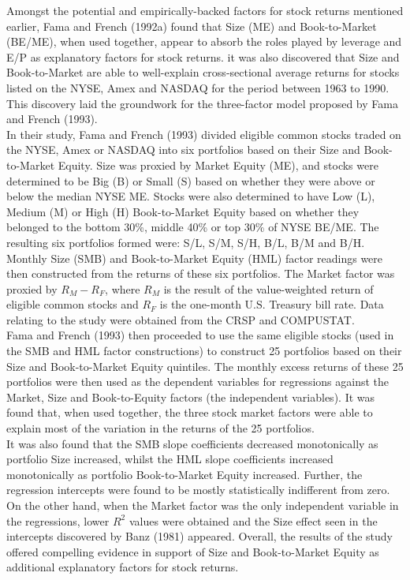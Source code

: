 \documentclass[12pt]{article}
\begin{document}
	\noindent Amongst the potential and empirically-backed factors for stock returns mentioned earlier, Fama and French (1992a) found that Size (ME) and Book-to-Market (BE/ME), when used together, appear to absorb the roles played by leverage and E/P as explanatory factors for stock returns. it was also discovered that Size and Book-to-Market are able to well-explain cross-sectional average returns for stocks listed on the NYSE, Amex and NASDAQ for the period between 1963 to 1990. This discovery laid the groundwork for the three-factor model proposed by Fama and French (1993).\\
	
	\noindent In their study, Fama and French (1993) divided eligible common stocks traded on the NYSE, Amex or NASDAQ into six portfolios based on their Size and Book-to-Market Equity. Size was proxied by Market Equity (ME), and stocks were determined to be Big (B) or Small (S) based on whether they were above or below the median NYSE ME. Stocks were also determined to have Low (L), Medium (M) or High (H) Book-to-Market Equity based on whether they belonged to the bottom 30\%, middle 40\% or top 30\% of NYSE BE/ME. The resulting six portfolios formed were: S/L, S/M, S/H, B/L, B/M and B/H. Monthly Size (SMB) and Book-to-Market Equity (HML) factor readings were then constructed from the returns of these six portfolios. The Market factor was proxied by $R_M - R_F$, where $R_M$ is the result of the value-weighted return of eligible common stocks and $R_F$ is the one-month U.S. Treasury bill rate. Data relating to the study were obtained from the CRSP and COMPUSTAT.\\
	
	\noindent Fama and French (1993) then proceeded to use the same eligible stocks (used in the SMB and HML factor constructions) to construct 25 portfolios based on their Size and Book-to-Market Equity quintiles. The monthly excess returns of these 25 portfolios were then used as the dependent variables for regressions against the Market, Size and Book-to-Equity factors (the independent variables). It was found that, when used together, the three stock market factors were able to explain most of the variation in the returns of the 25 portfolios.\\
	
	\noindent It was also found that the SMB slope coefficients decreased monotonically as portfolio Size increased, whilst the HML slope coefficients increased monotonically as portfolio Book-to-Market Equity increased. Further, the regression intercepts were found to be mostly statistically indifferent from zero. On the other hand, when the Market factor was the only independent variable in the regressions, lower $R^2$ values were obtained and the Size effect seen in the intercepts discovered by Banz (1981) appeared. Overall, the results of the study offered compelling evidence in support of Size and Book-to-Market Equity as additional explanatory factors for stock returns.\\
	
\end{document}
